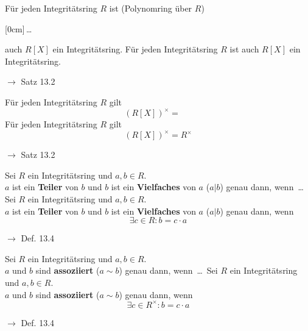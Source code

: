 \documentclass[11pt]{article}
\renewcommand{\cite}[1]{\par\bigskip\hfill{\color{gray}\tiny\(\to\) #1}}
\newcommand{\hide}[1]{\parbox{0cm}{\raisebox{-7pt}[0cm]{\dots}}\color{white}#1\color{black}}
\newcommand{\hint}[1]{{\color{lightgray}(#1)}}
\let\olddots\dots
\renewcommand{\dots}{\,\olddots\,}
\newenvironment{field}{}{\newpage}
\newif\ifnote
\newenvironment{note}{\notetrue}{\notefalse}
\newcommand{\localtag}{}
\newcommand{\globaltag}{}
\newcommand{\uuid}{}
\newcommand{\tags}[1]{
    \ifnote
        \renewcommand{\localtag}{#1}
    \else
        \renewcommand{\globaltag}{#1}
    \fi
    }
\newcommand{\xplain}[1]{\renewcommand{\uuid}{#1}}
\begin{document}
\begin{note}
    \tags{Satz}
    \xplain{14fc167f-f4e0-4a6d-bfd8-cab8ec0f0377}

    \begin{field}
        Für jeden Integritätsring $R$ ist \hint{Polynomring über $R$}\hide{auch $R[X]$ ein Integritätsring}.
    \end{field}
    \begin{field}
        Für jeden Integritätsring $R$ ist auch $R[X]$ ein Integritätsring.
        \cite{Satz 13.2}
    \end{field}

    \begin{field}
        Für jeden Integritätsring $R$ gilt
        \[(R[X])^\times = \phantom{R^{\times}}\]
    \end{field}
    \begin{field}
        Für jeden Integritätsring $R$ gilt
        \[(R[X])^\times = R^{\times}\]
        \cite{Satz 13.2}
    \end{field}
\end{note}


\begin{note}
    \tags{Def}
    \xplain{cbe89edb-ace5-43ba-afc9-5fa41ab1b1cb}

    \begin{field}
        Sei $R$ ein Integritätsring und $a,b\in R$.\\
        $a$ ist ein \textbf{Teiler} von $b$ und $b$ ist ein \textbf{Vielfaches} von $a$ ($a\vert b$) genau dann, wenn \dots
    \end{field}
    \begin{field}
        Sei $R$ ein Integritätsring und $a,b\in R$.\\
        $a$ ist ein \textbf{Teiler} von $b$ und $b$ ist ein \textbf{Vielfaches} von $a$ ($a\vert b$) genau dann, wenn
        \[\exists c\in R \colon b = c\cdot a\]
        \cite{Def. 13.4}
    \end{field}

    \begin{field}
        Sei $R$ ein Integritätsring und $a,b\in R$.\\
        $a$ und $b$ sind \textbf{assoziiert} ($a \sim b$) genau dann, wenn \dots
    \end{field}
    \begin{field}
        Sei $R$ ein Integritätsring und $a,b\in R$.\\
        $a$ und $b$ sind \textbf{assoziiert} ($a \sim b$) genau dann, wenn
        \[\exists c\in R^\times\colon b = c\cdot a\]
        \cite{Def. 13.4}
    \end{field}
\end{note}
\end{document}
